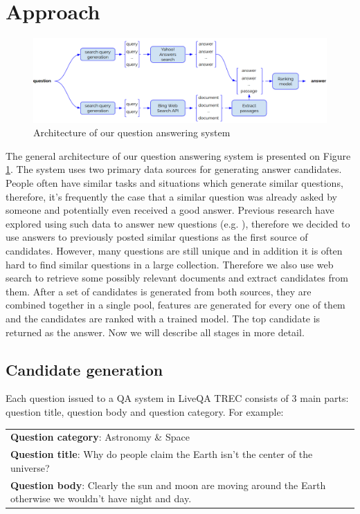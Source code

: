 \documentclass[]{article}
\begin{document}
\section{Approach}

\begin{figure}
	\includegraphics[width=450px]{img/qa_model}
	\caption{Architecture of our question answering system}
	\label{figure:qa_model}
\end{figure}

The general architecture of our question answering system is presented on Figure \ref{figure:qa_model}.
The system uses two primary data sources for generating answer candidates.
People often have similar tasks and situations which generate similar questions, therefore, it's frequently the case that a similar question was already asked by someone and potentially even received a good answer.
Previous research have explored using such data to answer new questions (e.g. \cite{Shtok:2012:LPA:2187836.2187939}), therefore we decided to use answers to previously posted similar questions as the first source of candidates.
However, many questions are still unique and in addition it is often hard to find similar questions in a large collection.
Therefore we also use web search to retrieve some possibly relevant documents and extract candidates from them.
After a set of candidates is generated from both sources, they are combined together in a single pool, features are generated for every one of them and the candidates are ranked with a trained model.
The top candidate is returned as the answer.
Now we will describe all stages in more detail.

\subsection{Candidate generation}
 
Each question issued to a QA system in LiveQA TREC consists of 3 main parts: question title, question body and question category.
For example:

\vspace{0.3cm}
\begin{tabular}{|p{15cm}|}
\hline
\textbf{Question category}: Astronomy \& Space\\
\textbf{Question title}: Why do people claim the Earth isn't the center of the universe?\\
\textbf{Question body}: Clearly the sun and moon are moving around the Earth otherwise we wouldn't have night and day.\\
\hline
\end{tabular}
\vspace{0.3cm}
\end{document}
